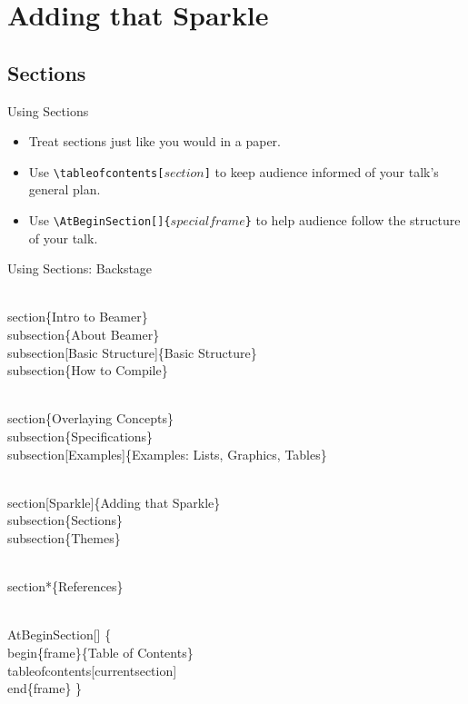 \documentclass[pdf]{beamer}
\begin{document}
\section[Sparkle]{Adding that Sparkle}

\subsection{Sections}

\begin{frame}[fragile]{Using Sections}
\begin{itemize}[<+->]
	\item Treat sections just like you would in a paper.
	\item Use \verb=\tableofcontents[=$section$\verb=]= to keep audience informed of your talk's general plan.
	\item Use \verb=\AtBeginSection[]{=$specialframe$\verb=}= to help audience follow the structure of your talk.
\end{itemize}
\end{frame}

\begin{frame}[fragile,allowframebreaks=1.1]{Using Sections: Backstage}
\begin{semiverbatim}
	\\section\{Intro to Beamer\}
	\\subsection\{About Beamer\}
	\\subsection[Basic Structure]\{Basic Structure\}
	\\subsection\{How to Compile\}
	
	\\section\{Overlaying Concepts\}
	\\subsection\{Specifications\}
	\\subsection[Examples]\{Examples: Lists, Graphics, Tables\}
	
	\\section[Sparkle]\{Adding that Sparkle\}
	\\subsection\{Sections\}
	\\subsection\{Themes\}
	
	\\section*\{References\}
\end{semiverbatim}
\begin{semiverbatim}
\\AtBeginSection[]
\{
    \\begin\{frame\}\{Table of Contents\}
        \\tableofcontents[currentsection]
    \\end\{frame\}
\}
\end{semiverbatim}
\end{frame}
\end{document}
